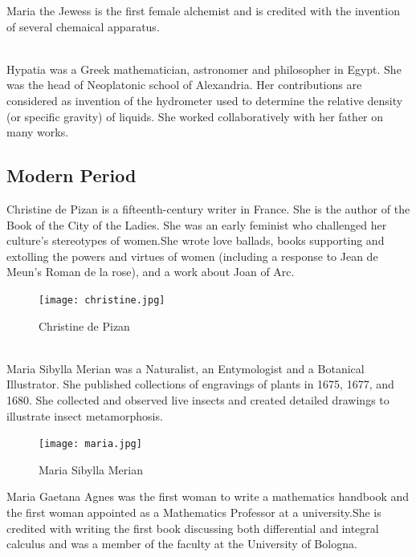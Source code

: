 \documentclass[a4paper,10pt]{article}
\begin{document}
\newblock
Maria the Jewess is the first female alchemist and is credited with the invention of several chemaical apparatus.

\newblock
\\Hypatia was a Greek mathematician, astronomer and philosopher in Egypt. She was the head of Neoplatonic school of Alexandria. Her contributions are considered as invention of the hydrometer used to determine the relative density (or specific gravity) of liquids. She worked collaboratively with her father on many works.\\

\subsection{Modern Period}

\newblock
Christine de Pizan is a fifteenth-century writer in France. She is the author of the Book of the City of the Ladies. She was an early feminist who challenged her culture's stereotypes of women.She wrote love ballads, books supporting and extolling the powers and virtues of women (including a response to Jean de Meun's Roman de la rose), and a work about Joan of Arc.\cite{christine}\\

\begin{center}
\begin{figure}[h]
\centering
 \texttt{[image: christine.jpg]}
 \caption{Christine de Pizan}
\end{figure}
\end{center}

\newblock
\\
Maria Sibylla Merian was a Naturalist, an Entymologist and a Botanical Illustrator. She published collections of engravings of plants in 1675, 1677, and 1680. She collected and observed live insects and created detailed drawings to illustrate insect metamorphosis.\cite{merian}


\begin{center}
\begin{figure}[h]
\centering
 \texttt{[image: maria.jpg]}
 \caption{Maria Sibylla Merian}
\end{figure}
\end{center}


\newblock
Maria Gaetana Agnes was the first woman to write a mathematics handbook and the first woman appointed as a Mathematics Professor at a university.She is credited with writing the first book discussing both differential and integral calculus and was a member of the faculty at the University of Bologna\cite{agnesi}.
\end{document}
